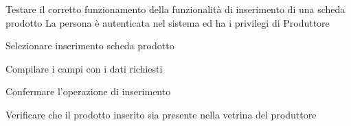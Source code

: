 {Testare il corretto funzionamento della funzionalità di inserimento di una scheda prodotto}
{La persona è autenticata nel sistema ed ha i privilegi di Produttore}
{\begin{enumCU}
    \item Selezionare inserimento scheda prodotto
    \item Compilare i campi con i dati richiesti
    \item Confermare l'operazione di inserimento
    \item Verificare che il prodotto inserito sia presente nella vetrina del produttore
\end{enumCU}}


{}
{}
{}


{}
{}
{}


{}
{}
{}


{}
{}
{}


{}
{}
{}


{}
{}
{}


{}
{}
{}







